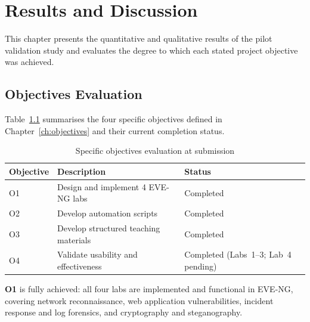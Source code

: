 
\chapter{Results and Discussion}\label{ch:results}

This chapter presents the quantitative and qualitative results of the pilot
validation study and evaluates the degree to which each stated project
objective was achieved.



\section{Objectives Evaluation}\label{sec:objectives_evaluation}

Table~\ref{tab:objectives_evaluation} summarises the four specific objectives
defined in Chapter~\ref{ch:objectives} and their current completion status.

\begin{table}[H]
  \centering
  \small
  \setlength{\tabcolsep}{4pt}
  \renewcommand{\arraystretch}{1.2}
  \begin{tabularx}{\textwidth}{l X l}
    \toprule
    \textbf{Objective} & \textbf{Description} & \textbf{Status} \\
    \midrule
    O1 & Design and implement 4 EVE-NG labs     & Completed \\
    O2 & Develop automation scripts              & Completed \\
    O3 & Develop structured teaching materials   & Completed \\
    O4 & Validate usability and effectiveness    & Completed (Labs~1--3; Lab~4 pending) \\
    \bottomrule
  \end{tabularx}
  \caption{Specific objectives evaluation at submission}
  \label{tab:objectives_evaluation}
\end{table}

\textbf{O1} is fully achieved: all four labs are implemented and functional in EVE-NG,
covering network reconnaissance, web application vulnerabilities, incident response
and log forensics, and cryptography and steganography.

